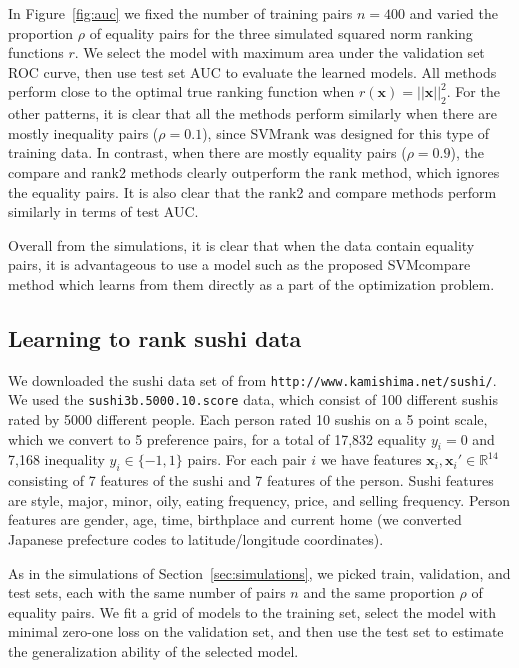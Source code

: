 \documentclass[twoside,11pt]{article}
\newcommand{\changed}[1]{
  #1
}
\newcommand{\RR}{\mathbb R}
\begin{document}
In Figure~\ref{fig:auc} we fixed the number of training pairs $n=400$
and varied the proportion $\rho$ of equality pairs for the three
simulated squared norm ranking functions $r$. We select the model with
maximum area under the validation set ROC curve, then use test set AUC
to evaluate the learned models. All methods perform close to the
optimal true ranking function when $r(\mathbf x)=||\mathbf
x||^2_2$. For the other patterns, it is clear that all the methods
perform similarly when there are mostly inequality pairs ($\rho=0.1$),
since SVMrank was designed for this type of training data. In
contrast, when there are mostly equality pairs ($\rho=0.9$), the
compare and rank2 methods clearly outperform the rank method, which
ignores the equality pairs. \changed{It is also clear that the rank2 and
compare methods perform similarly in terms of test AUC.}

\changed{Overall from the simulations, it is clear that when the data contain
equality pairs, it is advantageous to use a model such as the proposed
SVMcompare method which learns from them directly as a part of the
optimization problem.}

\subsection{Learning to rank sushi data}

We downloaded the sushi data set of \citet{object-ranking-methods}
from \texttt{http://www.kamishima.net/sushi/}. We used the
\texttt{sushi3b.5000.10.score} data, which consist of 100 different
sushis rated by 5000 different people. Each person rated 10 sushis on
a 5 point scale, which we convert to 5 preference pairs, for a total
of 17,832 equality $y_i=0$ and 7,168 inequality $y_i\in\{-1,1\}$
pairs. For each pair $i$ we have features $\mathbf x_i,\mathbf
x_i'\in\RR^{14}$ consisting of 7 features of the sushi and 7 features
of the person. Sushi features are style, major, minor, oily, eating
frequency, price, and selling frequency. Person features are gender, age,
time, birthplace and current home (we converted Japanese prefecture
codes to latitude/longitude coordinates).

As in the simulations of Section~\ref{sec:simulations}, we picked
train, validation, and test sets, each with the same number of pairs
$n$ and the same proportion $\rho$ of equality pairs. We fit a grid of
models to the training set, select the model with
minimal zero-one loss on the validation set, and then use the test set
to estimate the generalization ability of the selected model.
\end{document}
